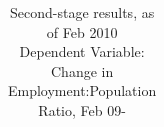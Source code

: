 \begin{table}
\caption[\emph{Jan24TableR1} \newline Analysis.Jan24.OutputBasicResults.do]
	{Second-stage results, as of Feb 2010 \\ Dependent Variable: Change in Employment:Population Ratio, Feb 09-\finaldate}
\label{ChangeEmpRatioTotNonfarm}
\begin{center}
    \begin{tabular}{  p{2in}  c  c  c  c  c  c }
    
    \end{tabular}
\newline\newline
\\
\end{center}
\end{table} 
